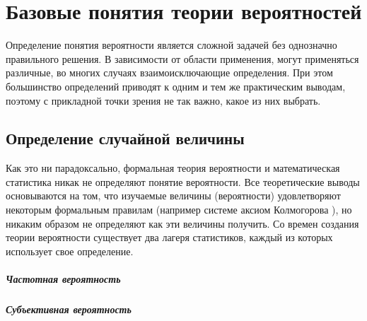 \chapter{Базовые понятия теории вероятностей}\label{ch:prob}

Определение понятия вероятности является сложной задачей без однозначно правильного решения. В зависимости от области применения, могут применяться различные, во многих случаях взаимоисключающие определения. При этом большинство определений приводят к одним и тем же практическим выводам, поэтому с прикладной точки зрения не так важно, какое из них выбрать. 

\section{Определение случайной величины}

Как это ни парадоксально, формальная теория вероятности и математическая статистика никак не определяют понятие вероятности. Все теоретические выводы основываются на том, что изучаемые величины (вероятности) удовлетворяют некоторым формальным правилам (например системе аксиом Колмогорова ), но никаким образом не определяют как эти величины получить. Со времен создания теории вероятности существует два лагеря статистиков, каждый из которых использует свое определение.

\paragraph{Частотная вероятность}


\paragraph{Субъективная вероятность}



